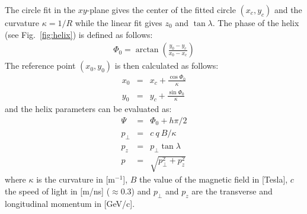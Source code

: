 \documentclass[twoside]{article}
\begin{document}
The circle fit in the $xy$-plane gives the center of the fitted circle $(x_c, y_c)$
and the curvature $\kappa = 1/R$ while the linear fit gives $z_0$ and $\tan \lambda$.
The phase of the helix (see Fig.~\ref{fig:helix}) is defined as follows:
\begin{eqnarray}
  \Phi_0 = \arctan \left( \frac{y_0 - y_c}{x_0 - x_c} \right)
\end{eqnarray}
The reference point $(x_0, y_0)$ is then calculated as follows:
\begin{eqnarray}
  x_0 & = & x_c + \frac{\cos \Phi_0}{\kappa} \\
  y_0 & = & y_c + \frac{\sin \Phi_0}{\kappa}
\end{eqnarray}
and the helix parameters can be evaluated as:
\begin{eqnarray}
  \Psi & = & \Phi_0 + h \pi / 2 \\
  p_\perp & = & c\ q\ B / \kappa \\
  p_z & = & p_\perp \tan \lambda \\
  p & = & \sqrt{p^2_\perp + p^2_z}
\end{eqnarray}
where $\kappa$ is the curvature in [m$^{-1}$], $B$ the value of the
magnetic field in [Tesla], $c$ the speed of light in [m/ns] ($\approx
0.3$) and $p_\perp$ and $p_z$ are the transverse and longitudinal
momentum in [GeV/c].
\end{document}
